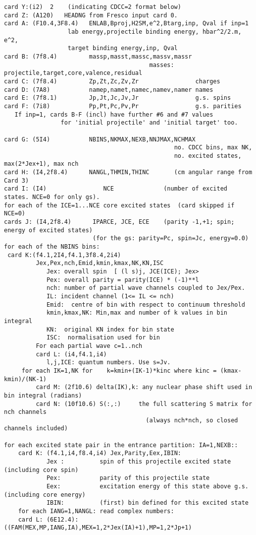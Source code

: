 \documentclass[11pt]{article}
\begin{document}
{\small
\begin{verbatim}
card Y:(i2)  2    (indicating CDCC=2 format below)
card Z: (A120)   HEADNG from Fresco input card 0.
card A: (F10.4,3F8.4)   ENLAB,Bproj,H2SM,e^2,Btarg,inp, Qval if inp=1
                  lab energy,projectile binding energy, hbar^2/2.m, e^2, 
                  target binding energy,inp, Qval 
card B: (7f8.4)         massp,masst,massc,massv,massr  
                                         masses: projectile,target,core,valence,residual
card C: (7f8.4)         Zp,Zt,Zc,Zv,Zr                charges
card D: (7A8)           namep,namet,namec,namev,namer names
card E: (7f8.1)         Jp,Jt,Jc,Jv,Jr                g.s. spins
card F: (7i8)           Pp,Pt,Pc,Pv,Pr                g.s. parities
   If inp=1, cards B-F (incl) have further #6 and #7 values 
                for 'initial projectile' and 'initial target' too.

card G: (5I4)           NBINS,NKMAX,NEXB,NNJMAX,NCHMAX
                                                no. CDCC bins, max NK,
                                                no. excited states, max(2*Jex+1), max nch
card H: (I4,2f8.4)      NANGL,THMIN,THINC       (cm angular range from Card 3)
card I: (I4)                NCE              (number of excited states. NCE=0 for only gs).
for each of the ICE=1...NCE core excited states  (card skipped if NCE=0)
cards J: (I4,2f8.4)      IPARCE, JCE, ECE    (parity -1,+1; spin; energy of excited states)
                         (for the gs: parity=Pc, spin=Jc, energy=0.0)
for each of the NBINS bins:
 card K:(f4.1,2I4,f4.1,3f8.4,2i4)
         Jex,Pex,nch,Emid,kmin,kmax,NK,KN,ISC
            Jex: overall spin  [ (l s)j, JCE(ICE); Jex>
            Pex: overall parity = parity(ICE) * (-1)**l
            nch: number of partial wave channels coupled to Jex/Pex.
            IL: incident channel (1<= IL <= nch)
            Emid:  centre of bin with respect to continuum threshold
            kmin,kmax,NK: Min,max and number of k values in bin integral
            KN:  original KN index for bin state
            ISC:  normalisation used for bin
         For each partial wave c=1..nch
         card L: (i4,f4.1,i4)
            l,j,ICE: quantum numbers. Use s=Jv.            
     for each IK=1,NK for    k=kmin+(IK-1)*kinc where kinc = (kmax-kmin)/(NK-1)
         card M: (2f10.6) delta(IK),k: any nuclear phase shift used in bin integral (radians)
         card N: (10f10.6) S(:,:)     the full scattering S matrix for nch channels 
                                        (always nch*nch, so closed channels included)

for each excited state pair in the entrance partition: IA=1,NEXB::
    card K: (f4.1,i4,f8.4,i4) Jex,Parity,Eex,IBIN:
            Jex :          spin of this projectile excited state (including core spin)
            Pex:           parity of this projectile state
            Eex:           excitation energy of this state above g.s. (including core energy)
            IBIN:          (first) bin defined for this excited state
    for each IANG=1,NANGL: read complex numbers:
    card L: (6E12.4): ((FAM(MEX,MP,IANG,IA),MEX=1,2*Jex(IA)+1),MP=1,2*Jp+1)
\end{verbatim}
}
\end{document}
